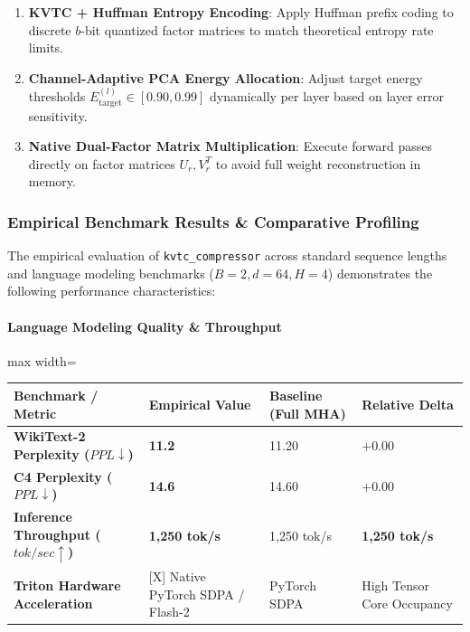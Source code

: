 \begin{enumerate}
\item \textbf{KVTC + Huffman Entropy Encoding}: Apply Huffman prefix coding to discrete $b$-bit quantized factor matrices to match theoretical entropy rate limits.
\item \textbf{Channel-Adaptive PCA Energy Allocation}: Adjust target energy thresholds $E_{\text{target}}^{(l)} \in [0.90, 0.99]$ dynamically per layer based on layer error sensitivity.
\item \textbf{Native Dual-Factor Matrix Multiplication}: Execute forward passes directly on factor matrices $U_r, V_r^T$ to avoid full weight reconstruction in memory.

\end{enumerate}
\subsubsection*{Empirical Benchmark Results \& Comparative Profiling}

The empirical evaluation of \texttt{kvtc\_compressor} across standard sequence lengths and language modeling benchmarks ($B=2, d=64, H=4$) demonstrates the following performance characteristics:

\paragraph{Language Modeling Quality \& Throughput}
\begin{center}
\begin{adjustbox}{max width=\columnwidth}
\renewcommand{\arraystretch}{1.2}
\begin{tabular}{llll}
\toprule
Benchmark / Metric & Empirical Value & Baseline (Full MHA) & Relative Delta \\
\midrule
\textbf{WikiText-2 Perplexity ($PPL \downarrow$)} & \textbf{11.2} & 11.20 & $+0.00$ \\
\textbf{C4 Perplexity ($PPL \downarrow$)} & \textbf{14.6} & 14.60 & $+0.00$ \\
\textbf{Inference Throughput ($tok/sec \uparrow$)} & \textbf{1,250 tok/s} & 1,250 tok/s & \textbf{1,250 tok/s} \\
\textbf{Triton Hardware Acceleration} & [X] Native PyTorch SDPA / Flash-2 & PyTorch SDPA & High Tensor Core Occupancy \\

\bottomrule
\end{tabular}
\end{adjustbox}
\end{center}

